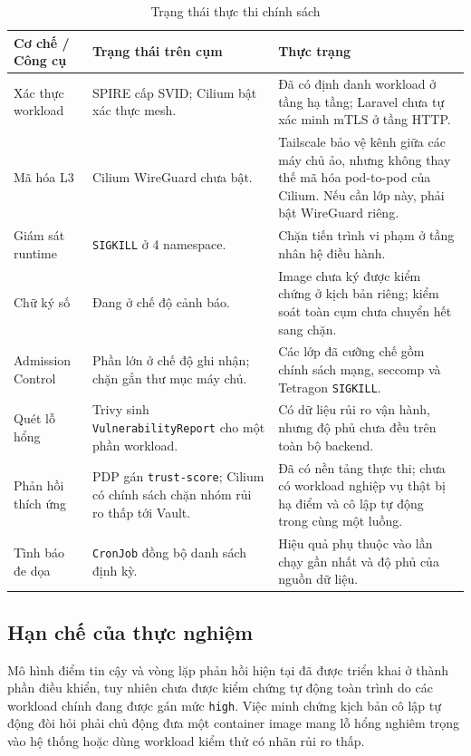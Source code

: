 \begin{table}[H]
\centering
\caption{Trạng thái thực thi chính sách}
\label{tab:enforcement_level}
\renewcommand{\arraystretch}{1.3}
\TableDeployColors
\begin{tabularx}{\textwidth}{|L{3.5cm}|Y|Y|}
\hline
{}
\textbf{Cơ chế / Công cụ} & \textbf{Trạng thái trên cụm} & \textbf{Thực trạng} \\
\hline
Xác thực workload & SPIRE cấp SVID; Cilium bật xác thực mesh. & Đã có định danh workload ở tầng hạ tầng; Laravel chưa tự xác minh mTLS ở tầng HTTP. \\
\hline
Mã hóa L3 & Cilium WireGuard chưa bật. & Tailscale bảo vệ kênh giữa các máy chủ ảo, nhưng không thay thế mã hóa pod-to-pod của Cilium. Nếu cần lớp này, phải bật WireGuard riêng. \\
\hline
Giám sát runtime & \texttt{SIGKILL} ở 4 namespace. & Chặn tiến trình vi phạm ở tầng nhân hệ điều hành. \\
\hline
Chữ ký số & Đang ở chế độ cảnh báo. & Image chưa ký được kiểm chứng ở kịch bản riêng; kiểm soát toàn cụm chưa chuyển hết sang chặn. \\
\hline
Admission Control & Phần lớn ở chế độ ghi nhận; chặn gắn thư mục máy chủ. & Các lớp đã cưỡng chế gồm chính sách mạng, seccomp và Tetragon \texttt{SIGKILL}. \\
\hline
Quét lỗ hổng & Trivy sinh \texttt{VulnerabilityReport} cho một phần workload. & Có dữ liệu rủi ro vận hành, nhưng độ phủ chưa đều trên toàn bộ backend. \\
\hline
Phản hồi thích ứng & PDP gán \texttt{trust-score}; Cilium có chính sách chặn nhóm rủi ro thấp tới Vault. & Đã có nền tảng thực thi; chưa có workload nghiệp vụ thật bị hạ điểm và cô lập tự động trong cùng một luồng. \\
\hline
Tình báo đe dọa & \texttt{CronJob} đồng bộ danh sách định kỳ. & Hiệu quả phụ thuộc vào lần chạy gần nhất và độ phủ của nguồn dữ liệu. \\
\hline
\end{tabularx}
\end{table}

\subsection{Hạn chế của thực nghiệm}

Mô hình điểm tin cậy và vòng lặp phản hồi hiện tại đã được triển khai ở thành phần điều khiển, tuy nhiên chưa được kiểm chứng tự động toàn trình do các workload chính đang được gán mức \texttt{high}. Việc minh chứng kịch bản cô lập tự động đòi hỏi phải chủ động đưa một container image mang lỗ hổng nghiêm trọng vào hệ thống hoặc dùng workload kiểm thử có nhãn rủi ro thấp.

